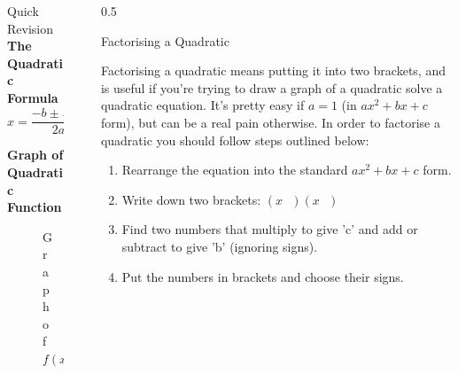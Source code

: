 \documentclass[final]{beamer}
\newlength{\sepwid}
\newlength{\onecolwid}
\begin{document}
\begin{frame}[t]
\begin{columns}[t]
\begin{column}{\onecolwid}
\begin{block}{Quick Revision}
        \textbf{The Quadratic Formula}
        $$x = \frac{-b\pm \sqrt{\Delta}}{2a}$$

        \textbf{Graph of Quadratic Function}

      \end{block}


      \begin{figure}
        \caption{Graph of $f(x)=ax^2|_{\{0.1, 0.3, 1.0, 3.0\}}$}
      \end{figure}


    \end{column} %

    \begin{column}{\sepwid}\end{column} %

    \begin{column}{\onecolwid} %

      \begin{columns}[t,totalwidth=\onecolwid] %

        \begin{column}{0.5\onecolwid}\vspace{-.6in} %


          \begin{block}{Factorising a Quadratic}

            Factorising a quadratic means putting it into two brackets, and is useful if you're trying to draw a graph of a quadratic solve a quadratic equation. It's pretty easy if $a=1$ (in $ax^2+bx+c$ form), but can be a real pain otherwise.
            \newline
            \newline
            In order to factorise a quadratic you should follow steps outlined below:

            \begin{enumerate}
            \item Rearrange the equation into the standard $ax^2+bx+c$ form.
            \item Write down two brackets: $(x\ \ \ )(x\ \ \ )$
            \item Find two numbers that multiply to give 'c' and add or subtract to give 'b' (ignoring signs).
            \item Put the numbers in brackets and choose their signs.
            \end{enumerate}


\end{block}
\end{column}
\end{columns}
\end{column}
\end{columns}
\end{frame}
\end{document}
